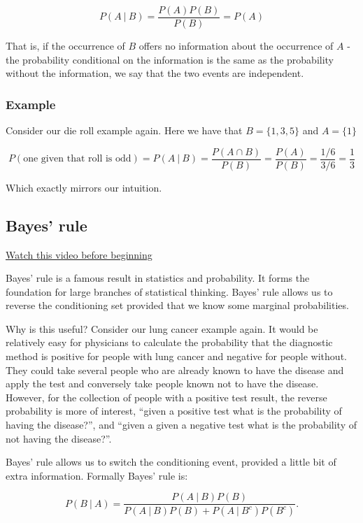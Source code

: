 \documentclass[]{article}
\begin{document}
\[
P(A ~|~ B) = \frac{P(A) P(B)}{P(B)} = P(A)
\]

That is, if the occurrence of $B$ offers no information about the
occurrence of $A$ - the probability conditional on the information is
the same as the probability without the information, we say that the two
events are independent.

\subsubsection{Example}\label{example-4}

Consider our die roll example again. Here we have that $B = \{1, 3, 5\}$
and $A = \{1\}$

\[
P(\mbox{one given that roll is odd}) = P(A ~|~ B)
= \frac{P(A \cap B)}{P(B)}
= \frac{P(A)}{P(B)}
= \frac{1/6}{3/6} = \frac{1}{3}
\]

Which exactly mirrors our intuition.

\subsection{Bayes' rule}\label{bayes-rule}

\href{http://youtu.be/TfeaZ_26iQk?list=PLpl-gQkQivXiBmGyzLrUjzsblmQsLtkzJ}{Watch
this video before beginning}

Bayes' rule is a famous result in statistics and probability. It forms
the foundation for large branches of statistical thinking. Bayes' rule
allows us to reverse the conditioning set provided that we know some
marginal probabilities.

Why is this useful? Consider our lung cancer example again. It would be
relatively easy for physicians to calculate the probability that the
diagnostic method is positive for people with lung cancer and negative
for people without. They could take several people who are already known
to have the disease and apply the test and conversely take people known
not to have the disease. However, for the collection of people with a
positive test result, the reverse probability is more of interest,
``given a positive test what is the probability of having the
disease?'', and ``given a given a negative test what is the probability
of not having the disease?''.

Bayes' rule allows us to switch the conditioning event, provided a
little bit of extra information. Formally Bayes' rule is:

\[
P(B ~|~ A) = \frac{P(A ~|~ B) P(B)}{P(A ~|~ B) P(B) + P(A ~|~ B^c)P(B^c)}.
\]
\end{document}

